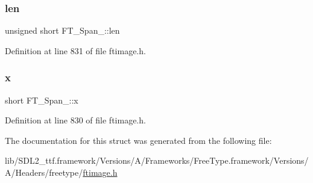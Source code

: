 \subsubsection{\texorpdfstring{len}{len}}
{\footnotesize\ttfamily unsigned short F\+T\+\_\+\+Span\+\_\+\+::len}



Definition at line 831 of file ftimage.\+h.

\mbox{\label{struct_f_t___span___a7f7235a404c66398b49c50fa09691ba5}} 
\subsubsection{\texorpdfstring{x}{x}}
{\footnotesize\ttfamily short F\+T\+\_\+\+Span\+\_\+\+::x}



Definition at line 830 of file ftimage.\+h.



The documentation for this struct was generated from the following file\+:\begin{DoxyCompactItemize}
\item 
lib/\+S\+D\+L2\+\_\+ttf.\+framework/\+Versions/\+A/\+Frameworks/\+Free\+Type.\+framework/\+Versions/\+A/\+Headers/freetype/\mbox{\hyperlink{ftimage_8h}{ftimage.\+h}}\end{DoxyCompactItemize}
